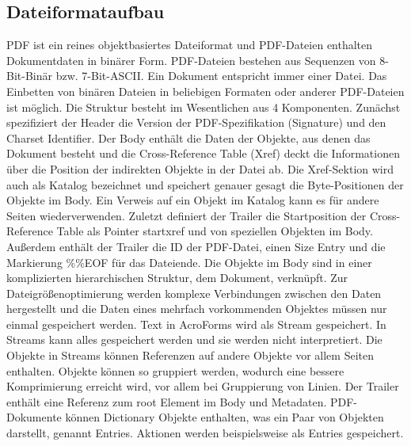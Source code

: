 \subsection{Dateiformataufbau}
PDF ist ein reines objektbasiertes Dateiformat und PDF-Dateien enthalten Dokumentdaten in binärer Form. PDF-Dateien bestehen aus Sequenzen von 8-Bit-Binär bzw. 7-Bit-ASCII. \cite{schneeberger} 
Ein Dokument entspricht immer einer Datei. Das Einbetten von binären Dateien in beliebigen Formaten oder anderer PDF-Dateien ist möglich. Die Struktur besteht im Wesentlichen aus 4 Komponenten. Zunächst spezifiziert der Header die Version der PDF-Spezifikation (Signature) und den Charset Identifier. \cite{ccc-pdf-secrets} Der Body enthält die Daten der Objekte, aus denen das Dokument besteht und die Cross-Reference Table (Xref) deckt die Informationen über die Position der indirekten Objekte in der Datei ab. Die Xref-Sektion wird auch als Katalog bezeichnet und speichert genauer gesagt die Byte-Positionen der Objekte im Body. Ein Verweis auf ein Objekt im Katalog kann es für andere Seiten wiederverwenden. Zuletzt definiert der Trailer die Startposition der Cross-Reference Table als Pointer startxref und von speziellen Objekten im Body. \cite{ccc-break-pdf} Außerdem enthält der Trailer die ID der PDF-Datei, einen Size Entry und die Markierung \%\%EOF für das Dateiende. \cite{ccc-pdf-secrets} 
Die Objekte im Body sind in einer komplizierten hierarchischen Struktur, dem Dokument, verknüpft. Zur Dateigrößenoptimierung werden komplexe Verbindungen zwischen den Daten hergestellt und die Daten eines mehrfach vorkommenden Objektes müssen nur einmal gespeichert werden. 
\cite{softx}
Text in AcroForms wird als Stream gespeichert. In Streams kann alles gespeichert werden und sie werden nicht interpretiert. Die Objekte in Streams können Referenzen auf andere Objekte vor allem Seiten enthalten. \cite{ccc-break-pdf} Objekte können so gruppiert werden, wodurch eine bessere Komprimierung erreicht wird, vor allem bei Gruppierung von Linien. \cite{schneeberger} Der Trailer enthält eine Referenz zum root Element im Body \cite{ccc-break-pdf} und Metadaten.
PDF-Dokumente können Dictionary Objekte enthalten, was ein Paar von Objekten darstellt, genannt Entries. Aktionen werden beispielsweise als Entries gespeichert. \cite{ccc-badpdf}
